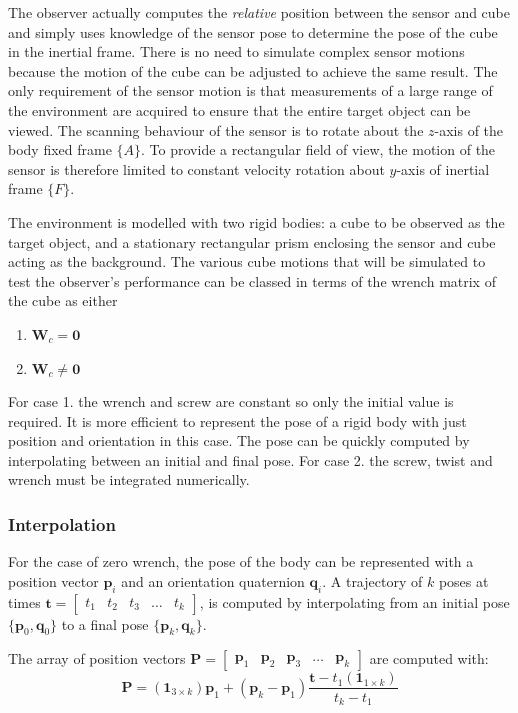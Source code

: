 The observer actually computes the \textit{relative} position between the sensor and cube and simply uses knowledge of the sensor pose to determine the pose of the cube in the inertial frame. There is no need to simulate complex sensor motions because the motion of the cube can be adjusted to achieve the same result. The only requirement of the sensor motion is that measurements of a large range of the environment are acquired to ensure that the entire target object can be viewed. The scanning behaviour of the sensor is to rotate about the $z$-axis of the body fixed frame $\{A\}$. To provide a rectangular field of view, the motion of the sensor is therefore limited to constant velocity rotation about $y$-axis of inertial frame $\{F\}$.

The environment is modelled with two rigid bodies: a cube to be observed as the target object, and a stationary rectangular prism enclosing the sensor and cube acting as the background. The various cube motions that will be simulated to test the observer's performance can be classed in terms of the wrench matrix of the cube as either
\begin{enumerate}
\item ${\textbf{W}_c} = \textbf{0}$
\item ${\textbf{W}_c} \neq \textbf{0}$
\end{enumerate}

For case 1. the wrench and screw are constant so only the initial value is required. It is more efficient to represent the pose of a rigid body with just position and orientation in this case. The pose can be quickly computed by interpolating between an initial and final pose. For case 2. the screw, twist and wrench must be integrated numerically.

\subsubsection{Interpolation}
For the case of zero wrench, the pose of the body can be represented with a position vector $\mathbf{p}_i$ and an orientation quaternion $\mathbf{q}_i$. A trajectory of $k$ poses at times 
$\mathbf{t} =
\begin{bmatrix}
	t_1 & t_2 & t_3 & \dots & t_k
\end{bmatrix}$,
is computed by interpolating from an initial pose $\{\mathbf{p}_0,\mathbf{q}_0\}$ to a final pose $\{\mathbf{p}_k,\mathbf{q}_k\}$.

The array of position vectors
$\mathbf{P}= \begin{bmatrix}
\mathbf{p}_1 & \mathbf{p}_2 & \mathbf{p}_3 & \dots & \mathbf{p}_k
\end{bmatrix}$
 are computed with:
\begin{equation}
	\mathbf{P} = 
	(\mathbf{1}_{3 \times k}){\mathbf{p}_1} + (\mathbf{p}_k - \mathbf{p}_1)\frac{\mathbf{t}-{t_1}(\mathbf{1}_{1 \times k})}{t_k - t_1}
\end{equation}

